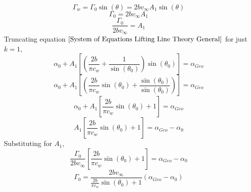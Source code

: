 \documentclass[a4paper, 12pt]{report}
\begin{document}
\begin{center}
$$\Gamma_{w} = \Gamma_{0}\sin(\theta) = 2bv_{\infty}A_{1}\sin(\theta)$$
$$\Gamma_{0} = 2bv_{\infty}A_{1}$$
$$\frac{\Gamma_{0}}{2bv_{\infty}} = A_{1}$$
Truncating equation $\ref{System of Equations Lifting Line Theory General}$ for just $k = 1$,
$$\alpha_{0} + A_{1}\left[\left(\frac{2b}{\pi c_{w}} + \frac{1}{\sin(\theta_{0})}\right)\sin(\theta_{0})\right] = \alpha_{Geo}$$
$$\alpha_{0} + A_{1}\left[\left(\frac{2b}{\pi c_{w}}\sin(\theta_{0}) + \frac{\sin(\theta_{0})}{\sin(\theta_{0})}\right)\right] = \alpha_{Geo}$$
$$\alpha_{0} + A_{1}\left[\frac{2b}{\pi c_{w}}\sin(\theta_{0}) + 1\right] = \alpha_{Geo}$$
$$A_{1}\left[\frac{2b}{\pi c_{w}}\sin(\theta_{0}) + 1\right] = \alpha_{Geo} - \alpha_{0}$$
Substituting for $A_{1}$,
$$\frac{\Gamma_{0}}{2bv_{\infty}}\left[\frac{2b}{\pi c_{w}}\sin(\theta_{0}) + 1\right] = \alpha_{Geo} - \alpha_{0}$$
\begin{equation}
\Gamma_{0} = \frac{2bv_{\infty}}{\displaystyle \frac{2b}{\pi c_{w}}\sin(\theta_{0}) + 1}\left(\alpha_{Geo} - \alpha_{0}\right)
\label{gamma0 in terms of alphas lifting line}
\end{equation}



\end{center}
\end{document}
